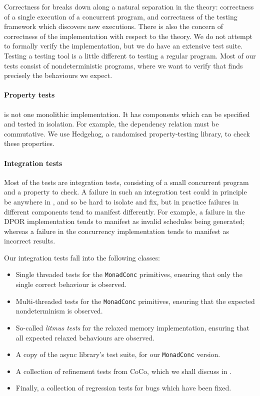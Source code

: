 Correctness for \dejafu{} breaks down along a natural separation in
the theory: correctness of a single execution of a concurrent program,
and correctness of the testing framework which discovers new
executions.  There is also the concern of correctness of the
implementation with respect to the theory.  We do not attempt to
formally verify the implementation, but we do have an extensive test
suite.  Testing a testing tool is a little different to testing a
regular program.  Most of our tests consist of nondeterministic
programs, where we want to verify that \dejafu{} finds precisely the
behaviours we expect.

\paragraph{Property tests}
\dejafu{} is not one monolithic implementation.  It has components
which can be specified and tested in isolation.  For example, the
dependency relation must be commutative.  We use
Hedgehog\cite{hedgehog}, a randomised property-testing library, to
check these properties.

\paragraph{Integration tests}
Most of the tests are integration tests, consisting of a small
concurrent program and a property to check.  A failure in such an
integration test could in principle be anywhere in \dejafu{}, and so
be hard to isolate and fix, but in practice failures in different
components tend to manifest differently.  For example, a failure in
the DPOR implementation tends to manifest as invalid schedules being
generated; whereas a failure in the concurrency implementation tends
to manifest as incorrect results.

Our integration tests fall into the following classes:

\begin{itemize}
\item Single threaded tests for the \verb|MonadConc| primitives,
  ensuring that only the single correct behaviour is observed.
\item Multi-threaded tests for the \verb|MonadConc| primitives,
  ensuring that the expected nondeterminism is observed.
\item So-called \emph{litmus tests} for the relaxed memory
  implementation, ensuring that all expected relaxed behaviours are
  observed.
\item A copy of the async library's\cite{async} test suite, for our
  \verb|MonadConc| version.
\item A collection of refinement tests from CoCo, which we shall
  discuss in .
\item Finally, a collection of regression tests for bugs which have
  been fixed.
\end{itemize}

